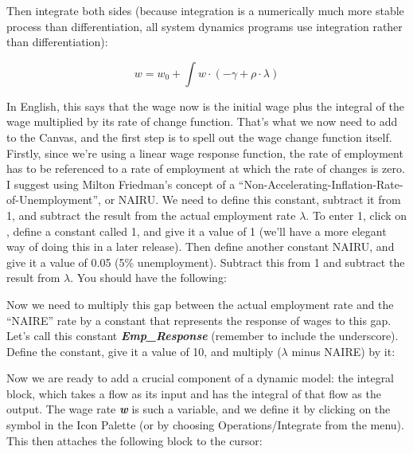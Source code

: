 Then integrate both sides (because integration is a numerically much
more stable process than differentiation, all system dynamics programs
use integration rather than differentiation): 

\begin{displaymath}
w=w_0+\int w\cdot(-\gamma+\rho\cdot\lambda)
\end{displaymath}

In English, this says that the wage now is the initial wage plus the
integral of the wage multiplied by its rate of change function. That's
what we now need to add to the Canvas, and the first step is to spell
out the wage change function itself. Firstly, since we're using a
linear wage response function, the rate of employment has to be
referenced to a rate of employment at which the rate of changes is
zero.  I suggest using Milton Friedman's concept of a
``Non-Accelerating-Inflation-Rate-of-Unemployment'', or NAIRU. We need
to define this constant, subtract it from 1, and subtract the result
from the actual employment rate $\lambda$. To enter 1, click on , define a
constant called 1, and give it a value of 1 (we'll have a more elegant
way of doing this in a later release). Then define another constant
NAIRU, and give it a value of 0.05 (5\% unemployment). Subtract this
from 1 and subtract the result from $\lambda$. You should have the following:


Now we need to multiply this gap between the actual employment rate
and the ``NAIRE'' rate by a constant that represents the response of
wages to this gap. Let's call this constant {\bf\em Emp\_Response} (remember to include the underscore). Define the constant, give it a value of 10, and multiply ($\lambda$ minus NAIRE) by it:


Now we are ready to add a crucial component of a dynamic model: the
integral block, which takes a flow as its input and has the integral
of that flow as the output. The wage rate {\bf\em w} is such a variable, and we
define it by clicking on the  symbol in the Icon Palette (or by
choosing Operations/Integrate from the menu). This then attaches the
following block to the cursor: 

\begin{center}
\end{center}


